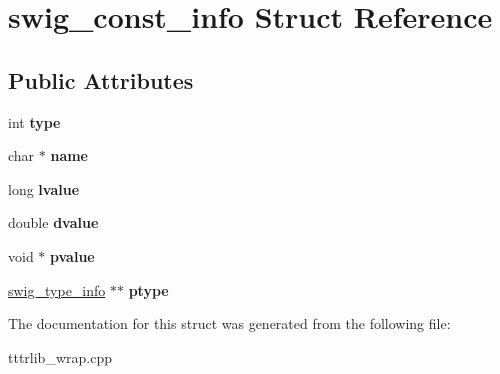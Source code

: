 \hypertarget{structswig__const__info}{}\section{swig\+\_\+const\+\_\+info Struct Reference}
\label{structswig__const__info}
\subsection*{Public Attributes}
\begin{DoxyCompactItemize}
\item 
\mbox{\label{structswig__const__info_ae8bbc99e1cda11f24e306365cbf33893}} 
int {\bfseries type}
\item 
\mbox{\label{structswig__const__info_aad383d74116313cf9a8532e163368050}} 
char $\ast$ {\bfseries name}
\item 
\mbox{\label{structswig__const__info_af142e4c21ad4fe61f6c2624bff034583}} 
long {\bfseries lvalue}
\item 
\mbox{\label{structswig__const__info_a74e477f1dbf515bcb7e2ef07a1d34c35}} 
double {\bfseries dvalue}
\item 
\mbox{\label{structswig__const__info_abbc43512c364bff11fac5961c1155090}} 
void $\ast$ {\bfseries pvalue}
\item 
\mbox{\label{structswig__const__info_aedd46d173c5b5ed4ee60ad5660233557}} 
\hyperlink{structswig__type__info}{swig\+\_\+type\+\_\+info} $\ast$$\ast$ {\bfseries ptype}
\end{DoxyCompactItemize}


The documentation for this struct was generated from the following file\+:\begin{DoxyCompactItemize}
\item 
tttrlib\+\_\+wrap.\+cpp\end{DoxyCompactItemize}
